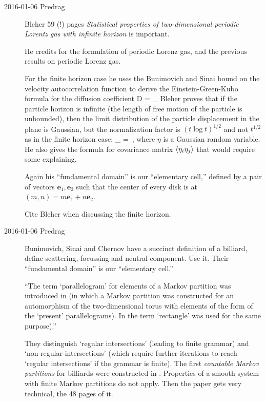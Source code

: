 \begin{description}
\item[2016-01-06 Predrag] Bleher 59 (!) pages
{\em Statistical properties of two-dimensional periodic Lorentz gas with
infinite horizon} is important.

He credits  for the formulation of
periodic Lorenz gas, and the previous results on periodic Lorenz gas.

                                                    \toCB
For the finite horizon case he uses the Bunimovich and Sinai
bound on the velocity autocorrelation function  to
derive the Einstein-Green-Kubo formula for the diffusion coefficient
\beq
D = \lim_{\zeit \to \infty} 
Bleher proves that if the particle horizon is infinite (the length of free
motion of the particle is unbounded), then the limit distribution of the
particle displacement in the plane is Gaussian, but the normalization
factor is $(t \log t)^{1/2}$ and not $t^{1/2}$ as in the finite horizon
case:
\beq
\lim_{\zeit \to \infty} 
= \eta
\,,
where $\eta$ is a Gaussian random variable. He also gives the formula for
covariance matrix $\langle {\eta_i \eta_j} \rangle$ that would require some
explaining.

Again his ``fundamental domain'' is our ``elementary cell,''
defined by a pair of vectors $\textbf{e}_1,\textbf{e}_2$ such that the
center of every disk is at $(m,n) = m\textbf{e}_1 + n\textbf{e}_2$.

Cite Bleher when discussing the finite horizon.

\item[2016-01-06 Predrag]                                \toCB
Bunimovich, Sinai and Chernov have a succinct definition of
a billiard, define scattering, focussing and neutral component. Use it.
Their ``fundamental domain'' is our ``elementary cell.''

``The term `parallelogram' for elements of a Markov partition was
introduced in  (in which a Markov partition was
constructed for an automorphism of the two-dimensional torus with
elements of the form of the `present' parallelograms). In
 the term `rectangle' was used for the same
purpose).''

They distinguish `regular intersections' (leading to finite grammar) and
`non-regular intersections' (which require further iterations to reach
`regular intersections' if the grammar is finite). The first
\emph{countable Markov partitions} for billiards were constructed in
. Properties of a smooth system with finite
Markov partitions  do not apply. Then the paper gets very technical,
the 48 pages of it.



\end{description}
